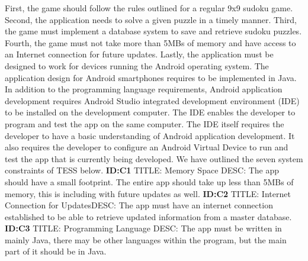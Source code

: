 \documentclass{article}
\begin{document}
First, the game should follow the rules outlined for a regular 9x9 sudoku game. Second, the application needs to solve a given puzzle in a timely manner. Third, the game must implement a database system to save and retrieve sudoku puzzles. Fourth, the game must not take more than 5MBs of memory and have access to an Internet connection for future updates. Lastly, the application must be designed to work for devices running the Android operating system. \newline \newline
The application design for Android smartphones requires to be implemented in Java. In addition to the programming language requirements, Android application development requires Android Studio integrated development environment (IDE) to be installed on the development computer. The IDE enables the developer to program and test the app on the same computer.\newline \newline
The IDE itself requires the developer to have a basic understanding of Android application development. It also requires the developer to configure an Android Virtual Device to run and test the app that is currently being developed. 
\newline \newline
We have outlined the seven system constraints of TESS below. 
\newline \newline
\textbf{ID:C1} \newline TITLE: Memory Space \newline DESC: The app should have a small footprint. The entire app should take up less than 5MBs of memory, this is including with future updates as well.\newline\newline
\textbf{ID:C2} \newline TITLE: Internet Connection for Updates\newline DESC: The app must have an internet connection established to be able to retrieve updated information from a master database. \newline\newline
\textbf{ID:C3} \newline TITLE: Programming Language \newline DESC: The app must be written in mainly Java, there may be other languages within the program, but the main part of it should be in Java.\newline\newline
\end{document}
